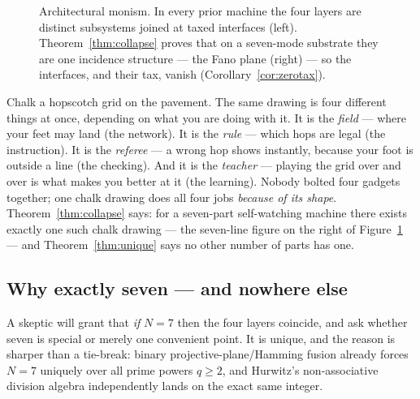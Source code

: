 \begin{figure}[H]
\caption{Architectural monism. In every prior machine the four layers are
distinct subsystems joined at taxed interfaces (left). Theorem~\ref{thm:collapse}
proves that on a seven-mode substrate they are one incidence structure ---
the Fano plane (right) --- so the interfaces, and their tax, vanish
(Corollary~\ref{cor:zerotax}).}
\label{fig:collapse}
\end{figure}

\begin{zerobox}
Chalk a hopscotch grid on the pavement. The same drawing is four different
things at once, depending on what you are doing with it. It is the
\emph{field} --- where your feet may land (the network). It is the
\emph{rule} --- which hops are legal (the instruction). It is the
\emph{referee} --- a wrong hop shows instantly, because your foot is outside
a line (the checking). And it is the \emph{teacher} --- playing the grid over
and over is what makes you better at it (the learning). Nobody bolted four
gadgets together; one chalk drawing does all four jobs \emph{because of its
shape}. Theorem~\ref{thm:collapse} says: for a seven-part self-watching
machine there exists exactly one such chalk drawing --- the seven-line figure
on the right of Figure~\ref{fig:collapse} --- and Theorem~\ref{thm:unique}
says no other number of parts has one.
\end{zerobox}

\subsection{Why exactly seven --- and nowhere else}

A skeptic will grant that \emph{if} $N=7$ then the four layers coincide, and
ask whether seven is special or merely one convenient point. It is unique,
and the reason is sharper than a tie-break: binary projective-plane/Hamming
fusion already forces $N=7$ uniquely over all prime powers $q\ge 2$, and
Hurwitz's non-associative division algebra independently lands on the exact same
integer.

